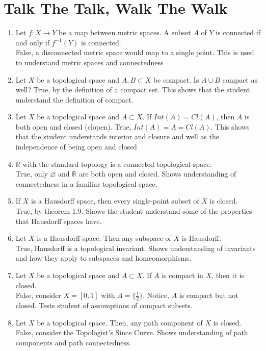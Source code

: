 \documentclass[12pt]{article}
\newcommand{\R}{\mathbb{R}}
\newcommand{\1}{^{-1}}
\begin{document}
	\section{Talk The Talk, Walk The Walk}
	\begin{enumerate}
		\item Let $ f: X\to Y $ be a map between metric spaces. A subset $ A $ of $ Y $ is connected if and only if $ f\1(Y) $ is connected.\\
		False, a disconnected metric space would map to a single point. This is used to understand metric spaces and connectedness 
		\item Let $ X $ be a topological space and $ A,B\subset X $ be compact. Is $ A\cup B $ compact as well?
		True, by the definition of a compact set. This shows that the student understand the definition of compact.
		\item Let $X$ be a topological space and $ A\subset X $. If $ Int(A)=Cl(A) $, then $ A $ is both open and closed (clopen).
		True, $ Int(A)=A=Cl(A) $. This shows that the student understands interior and closure and well as the independence of being open and closed
		\item $ \R $ with the standard topology is a connected topological space.\\
		True, only $ \varnothing $ and $ \R $ are both open and closed. Shows understanding of connectedness in a familiar topological space.
		\item If $ X $ is a Hausdorff space, then every single-point subset of $ X $ is closed.\\
		True, by theorem 1.9. Shows the student understand some of the properties that Hausdorff spaces have.
		\item Let $ X $ is a Hausdorff space. Then any subspace of $ X $ is Hausdorff.\\
		True, Hausdorff is a topological invariant. Shows understanding of invariants and how they apply to subspaces and homeomorphisms.
		\item Let $X$ be a topological space and $ A\subset X $. If $ A $ is compact in $ X $, then it is closed.\\
		False, consider $ X=[0,1] $ with $ A=\{\frac{1}{2}\} $. Notice, $ A $ is compact but not closed. Tests student of assumptions of compact subsets.
		\item Let $ X $ be a topological space. Then, any path component of $ X $ is closed.\\
		False, consider the Topologist's Since Curve. Shows understanding of path components and path connectedness.

\end{enumerate}
\end{document}
